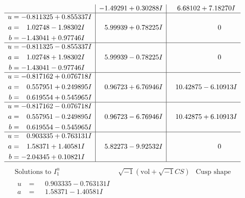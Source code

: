 \documentclass[1p]{elsarticle_modified}
\theoremstyle{definition}
\newcommand{\I}{\sqrt{-1}}
\begin{document}
$$\begin{array}{c|c|c}
 & -1.49291 + 0.30288 I & \phantom{-}6.68102 + 7.18270 I \\ \hline\begin{aligned}
u &= -0.811325 + 0.855337 I \\
a &= \phantom{-}1.02748 - 1.98302 I \\
b &= -1.43041 + 0.97746 I\end{aligned}
 & \phantom{-}5.99939 + 0.78225 I & \phantom{-0.000000 } 0 \\ \hline\begin{aligned}
u &= -0.811325 - 0.855337 I \\
a &= \phantom{-}1.02748 + 1.98302 I \\
b &= -1.43041 - 0.97746 I\end{aligned}
 & \phantom{-}5.99939 - 0.78225 I & \phantom{-0.000000 } 0 \\ \hline\begin{aligned}
u &= -0.817162 + 0.076718 I \\
a &= \phantom{-}0.557951 + 0.249895 I \\
b &= \phantom{-}0.619554 + 0.545965 I\end{aligned}
 & \phantom{-}0.96723 + 6.76946 I & \phantom{-}10.42875 - 6.10913 I \\ \hline\begin{aligned}
u &= -0.817162 - 0.076718 I \\
a &= \phantom{-}0.557951 - 0.249895 I \\
b &= \phantom{-}0.619554 - 0.545965 I\end{aligned}
 & \phantom{-}0.96723 - 6.76946 I & \phantom{-}10.42875 + 6.10913 I \\ \hline\begin{aligned}
u &= \phantom{-}0.903335 + 0.763131 I \\
a &= \phantom{-}1.58371 + 1.40581 I \\
b &= -2.04345 + 0.10821 I\end{aligned}
 & \phantom{-}5.82273 - 9.92532 I & \phantom{-0.000000 } 0\\
 \hline 
 \end{array}$$\newpage$$\begin{array}{c|c|c}  
\text{Solutions to }I^u_{1}& \I (\text{vol} + \sqrt{-1}CS) & \text{Cusp shape}\\
 \hline 
\begin{aligned}
u &= \phantom{-}0.903335 - 0.763131 I \\
a &= \phantom{-}1.58371 - 1.40581 I \\

\end{aligned}
\end{array}$$
\end{document}
